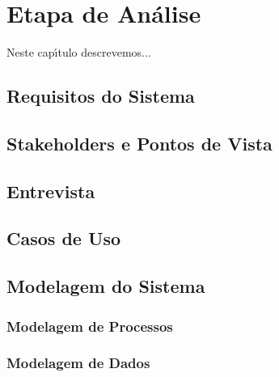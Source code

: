 
\chapter{Etapa de An\'{a}lise}

Neste cap\'{\i}tulo descrevemos...



\section{Requisitos do Sistema}



\section{Stakeholders e Pontos de Vista}


\section{Entrevista}


\section{ Casos de Uso}



\section{Modelagem do Sistema}


    \subsection{Modelagem de Processos}
    
    
    \subsection{Modelagem de Dados}
    
    